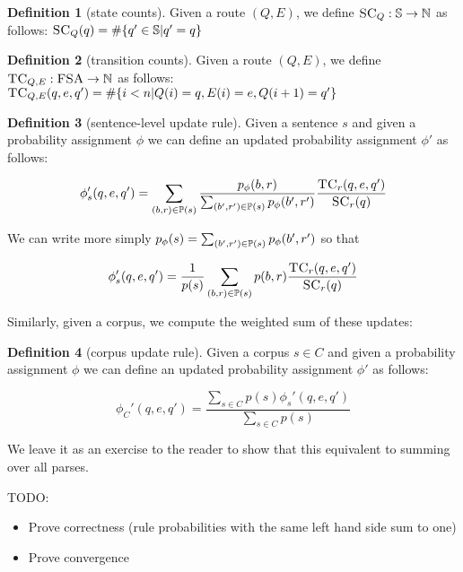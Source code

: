 \documentclass[12pt]{article}
\theoremstyle{definition}
\newtheorem{definition}{Definition}[section]
\begin{document}
\begin{definition}[state counts]
  Given a route $(Q,E)$, we define $\textsc{SC}_Q : \mathbb{S} \rightarrow\mathbb{N}$ as follows: $\textsc{SC}_Q(q) = \#\{ q'\in \mathbb{S} | q'=q \}$
\end{definition}


\begin{definition}[transition counts]
  Given a route $(Q,E)$, we define $\textsc{TC}_{Q,E} : \textsc{FSA} \rightarrow\mathbb{N}$ as follows: $\textsc{TC}_{Q,E}(q,e,q') = \#\{ i<n | Q(i)=q,E(i)=e,Q({i+1})=q'\}$
\end{definition}


\begin{definition}[sentence-level update rule]
  Given a sentence $s$ and given a probability assignment $\phi$ we can define an updated probability assignment $\phi'$ as follows:

  $$\phi_s'(q,e,q') = \sum_{(b,r)\in\mathbb{P}(s)}\frac{p_\phi(b,r)}{\sum_{(b',r')\in\mathbb{P}(s)}p_\phi(b',r')}\frac{\textsc{TC}_r(q,e,q')}{\textsc{SC}_r(q)}$$
\end{definition}

We can write more simply $p_\phi(s)=\sum_{(b',r')\in\mathbb{P}(s)}p_\phi(b',r')$ so that

$$\phi_s'(q,e,q') = \frac{1}{p(s)}\sum_{(b,r)\in\mathbb{P}(s)}p(b,r)\frac{\textsc{TC}_r(q,e,q')}{\textsc{SC}_r(q)}$$


Similarly, given a corpus, we compute the weighted sum of these updates:
\begin{definition}[corpus update rule]
  Given a corpus $s\in C$ and given a probability assignment $\phi$ we can define an updated probability assignment $\phi'$ as follows:

  $$\phi_C'(q,e,q') = \frac{\sum_{s\in C}p(s)\phi_s'(q,e,q')}{\sum_{s\in C}p(s)}$$
\end{definition}

We leave it as an exercise to the reader to show that this equivalent to summing over all parses.


TODO:
\begin{itemize}
\item Prove correctness (rule probabilities with the same left hand side sum to one)
\item Prove convergence
\end{itemize}
\end{document}
